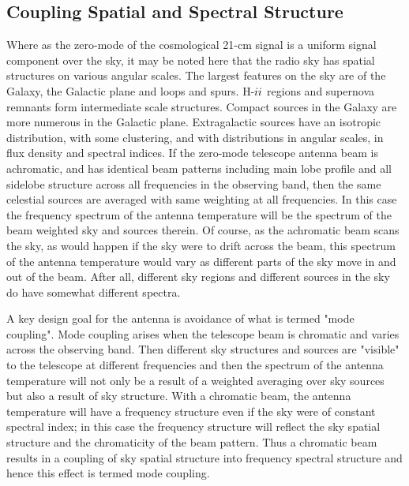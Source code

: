 \subsection{Coupling Spatial and Spectral Structure}
 
   Where as the zero-mode of the cosmological 21-cm signal is a uniform signal component over the sky, it may be noted here that the radio sky has spatial structures on various angular scales.  The largest features on the sky are of the Galaxy, the Galactic plane and loops and spurs.  H-${\sc ii}$ regions and supernova remnants form intermediate scale structures.  Compact sources in the Galaxy are more numerous in the Galactic plane. Extragalactic sources have an isotropic distribution, with some clustering, and with distributions in angular scales, in flux density and spectral indices.  If the zero-mode telescope antenna beam is achromatic, and has identical beam patterns including main lobe profile and all sidelobe structure across all frequencies in the observing band, then the same celestial sources are averaged with same weighting at all frequencies.  In this case the frequency spectrum of the antenna temperature will be the spectrum of the beam weighted sky and sources therein.  Of course, as the achromatic beam scans the sky, as would happen if the sky were to drift across the beam, this spectrum of the antenna temperature would vary as different parts of the sky move in and out of the beam.  After all, different sky regions and different sources in the sky do have somewhat different spectra.
   
   A key design goal for the antenna is avoidance of what is termed "mode coupling".  Mode coupling arises when the telescope beam is chromatic and varies across the observing band.  Then different sky structures and sources are "visible" to the telescope at different frequencies and then the spectrum of the antenna temperature will not only be a result of a weighted averaging over sky sources but also a result of sky structure.  With a chromatic beam, the antenna temperature will have a frequency structure even if the sky were of constant spectral index; in this case the frequency structure will reflect the sky spatial structure and the chromaticity of the beam pattern.  Thus a chromatic beam results in a coupling of sky spatial structure into frequency spectral structure and hence this effect is termed mode coupling.
   
